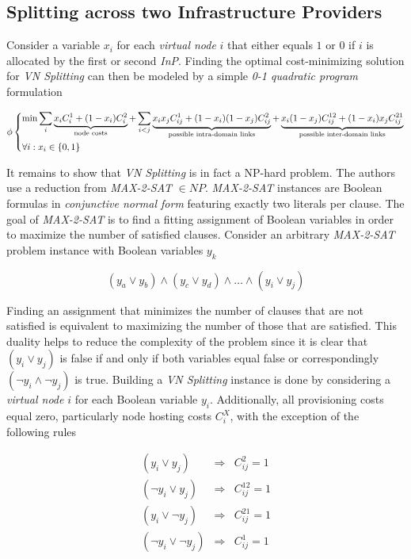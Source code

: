 \documentclass[prodmode,acmtomccap]{acmlarge}
\begin{document}
\subsection{Splitting across two Infrastructure Providers}
Consider a variable $x_i$ for each \emph{virtual node} $i$ that either equals $1$ or $0$ if $i$ is allocated by the first or second \emph{InP}. Finding the optimal cost-minimizing solution for
\emph{VN Splitting} can then be modeled by a simple \emph{0-1 quadratic program} formulation

\[
 \phi
   \begin{dcases}
		\min \sum\limits_{i} \underbrace{x_i C_i^1 + (1-x_i) C_i^2 }_{\text{node costs}}
			+ \sum\limits_{i < j} \underbrace{x_i x_j C_{ij}^{1} + (1 - x_i)(1 - x_j) C_{ij}^{2}}_{\text{possible intra-domain links}}
			+ \underbrace{x_i (1 - x_j) C_{ij}^{12} + (1 - x_i)x_j C_{ij}^{21}}_{\text{possible inter-domain links}} \\
		\forall i : x_i \in \{ 0,1\}
   \end{dcases}
\]

It remains to show that \emph{VN Splitting} is in fact a NP-hard problem. The authors use a reduction from \emph{MAX-2-SAT} $\in NP$. \emph{MAX-2-SAT} instances
are Boolean formulas in \emph{conjunctive normal form}
featuring exactly two literals per clause. The goal of \emph{MAX-2-SAT} is to find a fitting assignment of Boolean variables in order to maximize the number of satisfied clauses. Consider an arbitrary 
\emph{MAX-2-SAT} problem instance with Boolean variables $y_k$

$$
(y_a \vee y_b) \wedge (y_c \vee y_d) \wedge \dots \wedge (y_i \vee y_j)
$$

Finding an assignment that minimizes the number of clauses that are not satisfied is equivalent to maximizing the number of those that are satisfied. This duality helps to reduce the complexity of the problem
since it is clear that $(y_i \vee y_j)$ is false if and only if both variables equal false or correspondingly $(\lnot y_i \wedge \lnot y_j)$ is true.
Building a \emph{VN Splitting} instance is done by considering a \emph{virtual node} $i$ for each Boolean variable $y_i$. Additionally, all provisioning costs equal zero, particularly node hosting costs $C_i^{X}$,
with the exception of the following rules

$$
\begin{array}{ccr}
	(y_i \vee y_j) & \Rightarrow & C_{ij}^2 = 1 \\
	(\lnot y_i \vee y_j) & \Rightarrow &C_{ij}^{12} = 1 \\
	(y_i \vee \lnot y_j) & \Rightarrow & C_{ij}^{21} = 1 \\
	(\lnot y_i \vee \lnot y_j) & \Rightarrow & C_{ij}^1 = 1
\end{array}
$$
\end{document}
